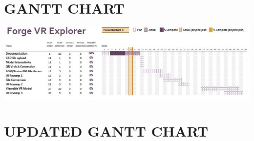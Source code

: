 \documentclass[letterpaper, 10pt, draftclsnofoot, compsoc, onecolumn]{IEEEtran}
\makeatletter
\def\subsubsection{\@startsection{subsubsection}%
                                 {3}%
                                 {\z@}%
                                 {1ex plus 0.1ex minus 0.1ex}%
                                 {1ex}%
                                 {\normalfont\normalsize}}%
\makeatother
\begin{document}

\clearpage
\section[GANTT CHART]{\rmfamily\bfseries\color{black}
GANTT CHART}

\begin{center}
	\includegraphics[scale=0.8]{GanttChart.jpg}
\end{center}
\clearpage
\section[UPDATED GANTT CHART]{\rmfamily\bfseries\color{black}
UPDATED GANTT CHART}
\end{document}
